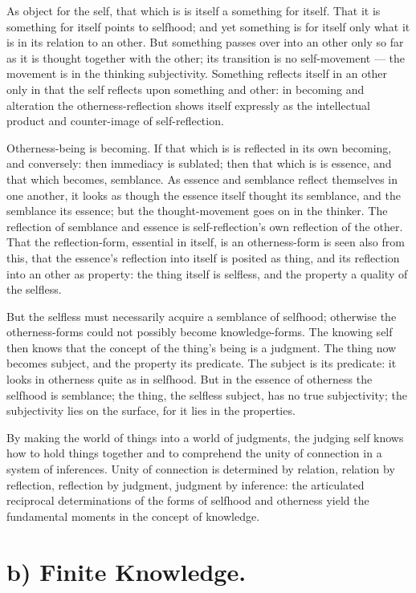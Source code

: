 \documentclass[12pt]{book}
\begin{document}
As object for the self, that which is is itself a something for
itself. That it is something for itself points to selfhood; and yet
something is for itself only what it is in its relation to an other.
But something passes over into an other only so far as it is thought
together with the other; its transition is no self-movement --- the
movement is in the thinking subjectivity. Something reflects itself
in an other only in that the self reflects upon something and other:
in becoming and alteration the otherness-reflection shows itself
expressly as the intellectual product and counter-image of
self-reflection.

Otherness-being is becoming. If that which is is reflected in its
own becoming, and conversely: then immediacy is sublated; then that
which is is essence, and that which becomes, semblance. As essence
and semblance reflect themselves in one another, it looks as though
the essence itself thought its semblance, and the semblance its
essence; but the thought-movement goes on in the thinker. The
reflection of semblance and essence is self-reflection's own
reflection of the other. That the reflection-form, essential in
itself, is an otherness-form is seen also from this, that the
essence's reflection into itself is posited as thing, and its
reflection into an other
as property: the thing itself is selfless, and the property a
quality of the selfless.

But the selfless must necessarily acquire a semblance of selfhood;
otherwise the otherness-forms could not possibly become
knowledge-forms. The knowing self then knows that the concept of the
thing's being is a judgment. The thing now becomes subject, and the
property its predicate. The subject is its predicate: it looks in
otherness quite as in selfhood. But in the essence of otherness the
selfhood is semblance; the thing, the selfless subject, has no true
subjectivity; the subjectivity lies on the surface, for it lies in
the properties.

By making the world of things into a world of judgments, the judging
self knows how to hold things together and to comprehend the unity
of connection in a system of inferences. Unity of connection is
determined by relation, relation by reflection, reflection by
judgment, judgment by inference: the articulated reciprocal
determinations of the forms of selfhood and otherness yield the
fundamental moments in the concept of knowledge.

\section*{b) Finite Knowledge.}
\end{document}
